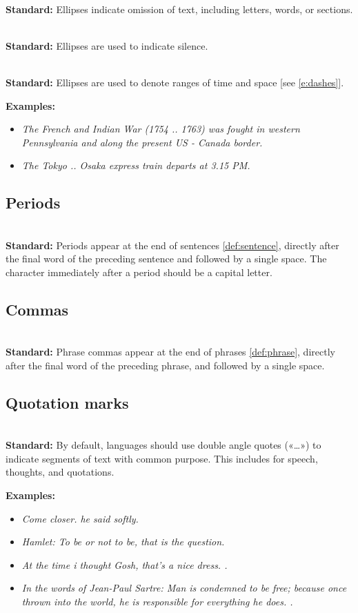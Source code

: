 \documentclass{article}
\newcommand{\standard}[1]{\quad  \\ \textbf{Standard:} {#1}}
\newcommand{\examples}[1]{
\textbf{Examples:} \begin{itemize}
#1
\end{itemize}
}
\newcommand{\example}[1]{\item \textit{#1}}
\newcommand{\langlequote}{\guillemotleft}
\newcommand{\ranglequote}{\guillemotright}
\begin{document}
\standard{Ellipses indicate omission of text, including letters, words, or
sections.}

\standard{Ellipses are used to indicate silence.}

\standard{Ellipses are used to denote ranges of time and space [see
\ref{e:dashes}].}

\examples{
  \example{The French and Indian War (1754 .. 1763) was fought in western
  Pennsylvania and along the present US - Canada border.}
  \example{The Tokyo .. Osaka express train departs at 3.15 PM.}
}

\subsection{Periods}

\standard{Periods appear at the end of sentences \ref{def:sentence}, directly
after the final word of the preceding sentence and followed by a single space.
The character immediately after a period should be a capital letter.}

\subsection{Commas}

\standard{Phrase commas appear at the end of phrases \ref{def:phrase},
directly after the final word of the preceding phrase, and followed by a
single space.}

\subsection{Quotation marks}

\standard{By default, languages should use double angle quotes («\dots») to
indicate segments of text with common purpose. This includes for speech,
thoughts, and quotations.}

\examples{
    \example{\langlequote Come closer. \ranglequote he said softly.}
    \example{Hamlet: \langlequote To be or not to be, that is the question.
    \ranglequote}
    \example{At the time i thought \langlequote Gosh, that's a nice dress.
  \ranglequote.}
  \example{In the words of Jean-Paul Sartre: \langlequote Man is condemned to be
  free; because once thrown into the world, he is responsible for everything he
  does. \ranglequote .}
}
\end{document}
